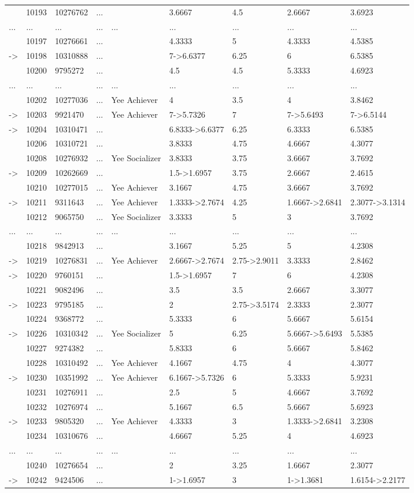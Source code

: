 \documentclass[6pt,a4paper]{article}
\begin{document}
\begin{landscape}
{\begin{longtable}{lllllllll}
&10193&10276762&...&&3.6667&4.5&2.6667&3.6923\tabularnewline
...&...&...&...&...&...&...&...&...\tabularnewline
&10197&10276661&...&&4.3333&5&4.3333&4.5385\tabularnewline
-\textgreater &10198&10310888&...&&7-\textgreater 6.6377&6.25&6&6.5385\tabularnewline
&10200&9795272&...&&4.5&4.5&5.3333&4.6923\tabularnewline
...&...&...&...&...&...&...&...&...\tabularnewline
&10202&10277036&...&Yee Achiever&4&3.5&4&3.8462\tabularnewline
-\textgreater &10203&9921470&...&Yee Achiever&7-\textgreater 5.7326&7&7-\textgreater 5.6493&7-\textgreater 6.5144\tabularnewline
-\textgreater &10204&10310471&...&&6.8333-\textgreater 6.6377&6.25&6.3333&6.5385\tabularnewline
&10206&10310721&...&&3.8333&4.75&4.6667&4.3077\tabularnewline
&10208&10276932&...&Yee Socializer&3.8333&3.75&3.6667&3.7692\tabularnewline
-\textgreater &10209&10262669&...&&1.5-\textgreater 1.6957&3.75&2.6667&2.4615\tabularnewline
&10210&10277015&...&Yee Achiever&3.1667&4.75&3.6667&3.7692\tabularnewline
-\textgreater &10211&9311643&...&Yee Achiever&1.3333-\textgreater 2.7674&4.25&1.6667-\textgreater 2.6841&2.3077-\textgreater 3.1314\tabularnewline
&10212&9065750&...&Yee Socializer&3.3333&5&3&3.7692\tabularnewline
...&...&...&...&...&...&...&...&...\tabularnewline
&10218&9842913&...&&3.1667&5.25&5&4.2308\tabularnewline
-\textgreater &10219&10276831&...&Yee Achiever&2.6667-\textgreater 2.7674&2.75-\textgreater 2.9011&3.3333&2.8462\tabularnewline
-\textgreater &10220&9760151&...&&1.5-\textgreater 1.6957&7&6&4.2308\tabularnewline
&10221&9082496&...&&3.5&3.5&2.6667&3.3077\tabularnewline
-\textgreater &10223&9795185&...&&2&2.75-\textgreater 3.5174&2.3333&2.3077\tabularnewline
&10224&9368772&...&&5.3333&6&5.6667&5.6154\tabularnewline
-\textgreater &10226&10310342&...&Yee Socializer&5&6.25&5.6667-\textgreater 5.6493&5.5385\tabularnewline
&10227&9274382&...&&5.8333&6&5.6667&5.8462\tabularnewline
&10228&10310492&...&Yee Achiever&4.1667&4.75&4&4.3077\tabularnewline
\newpage
-\textgreater &10230&10351992&...&Yee Achiever&6.1667-\textgreater 5.7326&6&5.3333&5.9231\tabularnewline
&10231&10276911&...&&2.5&5&4.6667&3.7692\tabularnewline
&10232&10276974&...&&5.1667&6.5&5.6667&5.6923\tabularnewline
-\textgreater &10233&9805320&...&Yee Achiever&4.3333&3&1.3333-\textgreater 2.6841&3.2308\tabularnewline
&10234&10310676&...&&4.6667&5.25&4&4.6923\tabularnewline
...&...&...&...&...&...&...&...&...\tabularnewline
&10240&10276654&...&&2&3.25&1.6667&2.3077\tabularnewline
-\textgreater &10242&9424506&...&&1-\textgreater 1.6957&3&1-\textgreater 1.3681&1.6154-\textgreater 2.2177\tabularnewline
\hline
\end{longtable}}

\end{landscape}
\end{document}
